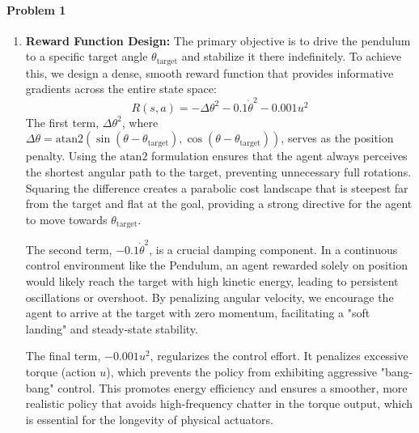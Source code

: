 \documentclass[12pt]{scrartcl}
\begin{document}
\paragraph*{Problem 1}
\begin{enumerate}
    \item \textbf{Reward Function Design:} The primary objective is to drive the pendulum to a specific target angle $\theta_{\text{target}}$ and stabilize it there indefinitely. To achieve this, we design a dense, smooth reward function that provides informative gradients across the entire state space:
    \begin{equation}
    R(s, a) = - \Delta\theta^2 - 0.1 \dot{\theta}^2 - 0.001 u^2
    \end{equation}
    The first term, $\Delta\theta^2$, where $\Delta\theta = \text{atan2}(\sin(\theta - \theta_{\text{target}}), \cos(\theta - \theta_{\text{target}}))$, serves as the position penalty. Using the $\text{atan2}$ formulation ensures that the agent always perceives the shortest angular path to the target, preventing unnecessary full rotations. Squaring the difference creates a parabolic cost landscape that is steepest far from the target and flat at the goal, providing a strong directive for the agent to move towards $\theta_{\text{target}}$.
    
    The second term, $- 0.1 \dot{\theta}^2$, is a crucial damping component. In a continuous control environment like the Pendulum, an agent rewarded solely on position would likely reach the target with high kinetic energy, leading to persistent oscillations or overshoot. By penalizing angular velocity, we encourage the agent to arrive at the target with zero momentum, facilitating a "soft landing" and steady-state stability.
    
    The final term, $- 0.001 u^2$, regularizes the control effort. It penalizes excessive torque (action $u$), which prevents the policy from exhibiting aggressive "bang-bang" control. This promotes energy efficiency and ensures a smoother, more realistic policy that avoids high-frequency chatter in the torque output, which is essential for the longevity of physical actuators.


\end{enumerate}
\end{document}
